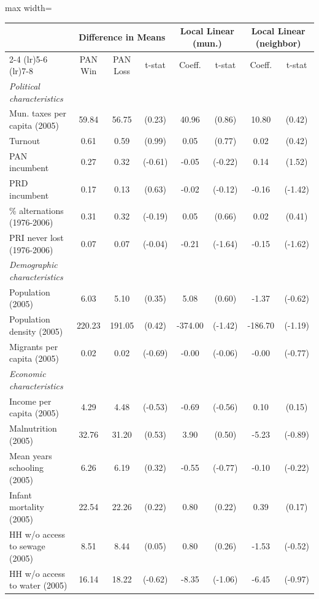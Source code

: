 \begin{adjustbox}{max width=\textwidth}
\begin{tabular}{lccccccc}
\toprule
 & \multicolumn{3}{c}{Difference in Means}
 & \multicolumn{2}{c}{Local Linear (mun.)}
 & \multicolumn{2}{c}{Local Linear (neighbor)} \\
\cmidrule(lr){2-4} \cmidrule(lr){5-6} \cmidrule(lr){7-8}
 & PAN Win & PAN Loss & t-stat & Coeff. & t-stat & Coeff. & t-stat \\
\midrule
\textit{Political characteristics} &  &  &  &  &  &  &  \\
Mun. taxes per capita (2005) & 59.84 & 56.75 & (0.23) & 40.96 & (0.86) & 10.80 & (0.42) \\
Turnout & 0.61 & 0.59 & (0.99) & 0.05 & (0.77) & 0.02 & (0.42) \\
PAN incumbent & 0.27 & 0.32 & (-0.61) & -0.05 & (-0.22) & 0.14 & (1.52) \\
PRD incumbent & 0.17 & 0.13 & (0.63) & -0.02 & (-0.12) & -0.16 & (-1.42) \\
\% alternations (1976-2006) & 0.31 & 0.32 & (-0.19) & 0.05 & (0.66) & 0.02 & (0.41) \\
PRI never lost  (1976-2006) & 0.07 & 0.07 & (-0.04) & -0.21 & (-1.64) & -0.15 & (-1.62) \\
\addlinespace
\textit{Demographic characteristics} &  &  &  &  &  &  &  \\
Population (2005) & 6.03 & 5.10 & (0.35) & 5.08 & (0.60) & -1.37 & (-0.62) \\
Population density (2005) & 220.23 & 191.05 & (0.42) & -374.00 & (-1.42) & -186.70 & (-1.19) \\
Migrants per capita (2005) & 0.02 & 0.02 & (-0.69) & -0.00 & (-0.06) & -0.00 & (-0.77) \\
\addlinespace
\textit{Economic characteristics} &  &  &  &  &  &  &  \\
Income per capita (2005) & 4.29 & 4.48 & (-0.53) & -0.69 & (-0.56) & 0.10 & (0.15) \\
Malnutrition (2005) & 32.76 & 31.20 & (0.53) & 3.90 & (0.50) & -5.23 & (-0.89) \\
Mean years schooling (2005) & 6.26 & 6.19 & (0.32) & -0.55 & (-0.77) & -0.10 & (-0.22) \\
Infant mortality (2005) & 22.54 & 22.26 & (0.22) & 0.80 & (0.22) & 0.39 & (0.17) \\
HH w/o access to sewage (2005) & 8.51 & 8.44 & (0.05) & 0.80 & (0.26) & -1.53 & (-0.52) \\
HH w/o access to water (2005) & 16.14 & 18.22 & (-0.62) & -8.35 & (-1.06) & -6.45 & (-0.97) \\

\end{tabular}
\end{adjustbox}
